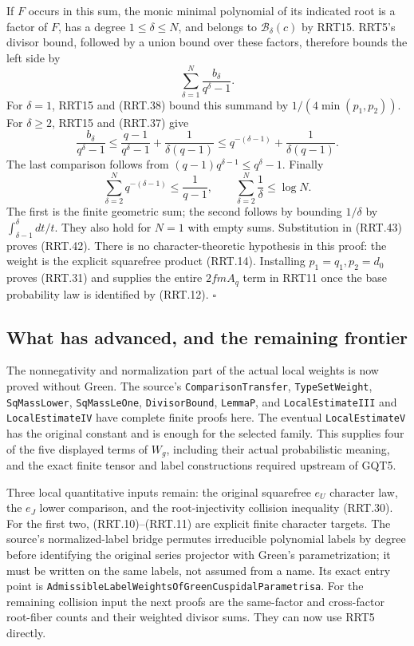 \documentclass[11pt,a4paper]{article}
\numberwithin{equation}{section}
\theoremstyle{remark}\newtheorem{remark}[theorem]{Remark}
\begin{document}
If $F$ occurs in this sum, the monic minimal polynomial of
its indicated root is a factor of $F$, has a degree
$1\le\delta\le N$, and belongs to $\mathcal B_\delta(c)$
by RRT15.  RRT5's divisor bound, followed by a union bound
over these factors, therefore bounds the left side by
\[
                  \sum_{\delta=1}^N
                                \frac{b_\delta}{q^\delta-1}.
 \tag{RRT.43}
\]
For $\delta=1$, RRT15 and (RRT.38) bound this summand by
$1/(4\min(p_1,\allowbreak{} p_2))$.  For $\delta\ge2$, RRT15 and
(RRT.37) give
\[
 \frac{b_\delta}{q^\delta-1}
       \le\frac{q-1}{q^\delta-1}+\frac1{\delta(q-1)}
       \le q^{-(\delta-1)}+\frac1{\delta(q-1)}.
 \tag{RRT.44}
\]
The last comparison follows from
$(q-1)q^{\delta-1}\le q^\delta-1$.
Finally
\[
 \sum_{\delta=2}^Nq^{-(\delta-1)}\le\frac1{q-1},
 \qquad \sum_{\delta=2}^N\frac1\delta\le\log N.
\]
The first is the finite geometric sum; the second follows
by bounding $1/\delta$ by
$\int_{\delta-1}^{\delta}dt/t$.  They also hold for $N=1$
with empty sums.  Substitution in (RRT.43) proves (RRT.42).
There is no character-theoretic hypothesis in this proof:
the weight is the explicit squarefree product (RRT.14).
Installing $p_1=q_1,\allowbreak{} p_2=d_0$ proves (RRT.31) and supplies
the entire $2fmA_q$ term in RRT11 once the base probability
law is identified by (RRT.12).
\hfill$\square$

\subsection{What has advanced, and the remaining frontier}

The nonnegativity and normalization part of the actual local
weights is now proved without Green.  The source's
\texttt{Comparison\allowbreak Transfer}, \texttt{Type\allowbreak Set\allowbreak Weight},
\texttt{Sq\allowbreak Mass\allowbreak Lower}, \texttt{Sq\allowbreak Mass\allowbreak Le\allowbreak One},
\texttt{Divisor\allowbreak Bound}, \texttt{Lemma\allowbreak P}, and
\texttt{Local\allowbreak Estimate\allowbreak III} and \texttt{Local\allowbreak Estimate\allowbreak IV} have
complete finite proofs here.
The eventual \texttt{Local\allowbreak Estimate\allowbreak V} has the original constant
and is enough for the selected family.  This supplies four of
the five displayed terms of $W_g$, including their actual
probabilistic meaning, and the exact finite tensor and label
constructions required upstream of GQT5.

Three local quantitative inputs remain: the original
squarefree $e_U$ character law, the $e_J$ lower comparison,
and the root-injectivity collision inequality (RRT.30).
For the first two, (RRT.10)--(RRT.11) are explicit finite
character targets.  The source's normalized-label bridge
permutes irreducible polynomial labels by degree before
identifying the original series projector with Green's
parametrization; it must be written on the same labels, not
assumed from a name.  Its exact entry point is
\texttt{Admissible\allowbreak Label\allowbreak Weights\allowbreak Of\allowbreak Green\allowbreak Cuspidal\allowbreak Parametrisa}.
For the remaining collision input the next proofs are the
same-factor and cross-factor root-fiber counts and their
weighted divisor sums.  They can now use RRT5 directly.
\end{document}

